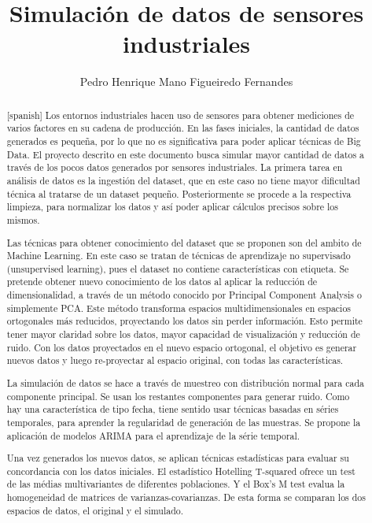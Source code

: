\documentclass[11pt,spanish,listoffigures,listoftables]{tfgetsinf}
\title{Simulación de datos de sensores industriales}
\author{Pedro Henrique Mano Figueiredo Fernandes}
\begin{document}

\begin{abstract}[spanish]
Los entornos industriales hacen uso de sensores para obtener mediciones de varios factores en su cadena de producción. En las fases iniciales, la cantidad de datos generados es pequeña, por lo que no es significativa para poder aplicar técnicas de Big Data. El proyecto descrito en este documento busca simular mayor cantidad de datos a través de los pocos datos generados por sensores industriales. La primera tarea en análisis de datos es la ingestión del dataset, que en este caso no tiene mayor dificultad técnica al tratarse de un dataset pequeño. Posteriormente se procede a la respectiva limpieza, para normalizar los datos y así poder aplicar cálculos precisos sobre los mismos.

Las técnicas para obtener conocimiento del dataset que se proponen son del ambito de Machine Learning. En este caso se tratan de técnicas de aprendizaje no supervisado (unsupervised learning), pues el dataset no contiene  características con etiqueta. Se pretende obtener nuevo conocimiento de los datos al aplicar la reducción de dimensionalidad, a través de un método conocido por Principal Component Analysis o simplemente PCA. Este método transforma espacios multidimensionales en espacios ortogonales más reducidos, proyectando los datos sin perder información. Esto permite tener mayor claridad sobre los datos, mayor capacidad de visualización y reducción de ruido. Con los datos proyectados en el nuevo espacio ortogonal, el objetivo es generar nuevos datos y luego re-proyectar al espacio original, con todas las características.

La simulación de datos se hace a través de muestreo con distribución normal para cada componente principal. Se usan los restantes componentes para generar ruido. Como hay una característica de tipo fecha, tiene sentido usar técnicas basadas en séries temporales, para aprender la regularidad de generación de las muestras. Se propone la aplicación de modelos ARIMA para el aprendizaje de la série temporal.

Una vez generados los nuevos datos, se aplican técnicas estadísticas para evaluar su concordancia con los datos iniciales. El estadístico Hotelling T-squared ofrece un test de las médias multivariantes de diferentes poblaciones. Y el Box's M test evalua la homogeneidad de matrices de varianzas-covarianzas. De esta forma se comparan los dos espacios de datos, el original y el simulado.
\end{abstract}
\end{document}
